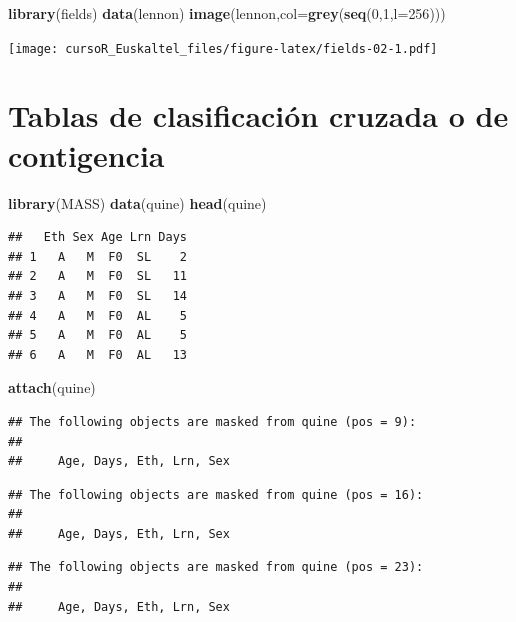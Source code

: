 \documentclass[]{book}
\newenvironment{Shaded}{\begin{snugshade}}{\end{snugshade}}
\newcommand{\KeywordTok}[1]{\textcolor[rgb]{0.13,0.29,0.53}{\textbf{#1}}}
\newcommand{\DataTypeTok}[1]{\textcolor[rgb]{0.13,0.29,0.53}{#1}}
\newcommand{\DecValTok}[1]{\textcolor[rgb]{0.00,0.00,0.81}{#1}}
\newcommand{\NormalTok}[1]{#1}
\begin{document}
\begin{Shaded}
\begin{Highlighting}[]
\KeywordTok{library}\NormalTok{(fields)}
\KeywordTok{data}\NormalTok{(lennon)}
\KeywordTok{image}\NormalTok{(lennon,}\DataTypeTok{col=}\KeywordTok{grey}\NormalTok{(}\KeywordTok{seq}\NormalTok{(}\DecValTok{0}\NormalTok{,}\DecValTok{1}\NormalTok{,}\DataTypeTok{l=}\DecValTok{256}\NormalTok{)))}
\end{Highlighting}
\end{Shaded}

\texttt{[image: cursoR\_Euskaltel\_files/figure-latex/fields-02-1.pdf]}

\section{Tablas de clasificación cruzada o de
contigencia}\label{tablas-de-clasificacion-cruzada-o-de-contigencia}

\begin{Shaded}
\begin{Highlighting}[]
\KeywordTok{library}\NormalTok{(MASS)}
\KeywordTok{data}\NormalTok{(quine)}
\KeywordTok{head}\NormalTok{(quine)}
\end{Highlighting}
\end{Shaded}

\begin{verbatim}
##   Eth Sex Age Lrn Days
## 1   A   M  F0  SL    2
## 2   A   M  F0  SL   11
## 3   A   M  F0  SL   14
## 4   A   M  F0  AL    5
## 5   A   M  F0  AL    5
## 6   A   M  F0  AL   13
\end{verbatim}

\begin{Shaded}
\begin{Highlighting}[]
\KeywordTok{attach}\NormalTok{(quine)}
\end{Highlighting}
\end{Shaded}

\begin{verbatim}
## The following objects are masked from quine (pos = 9):
## 
##     Age, Days, Eth, Lrn, Sex
\end{verbatim}

\begin{verbatim}
## The following objects are masked from quine (pos = 16):
## 
##     Age, Days, Eth, Lrn, Sex
\end{verbatim}

\begin{verbatim}
## The following objects are masked from quine (pos = 23):
## 
##     Age, Days, Eth, Lrn, Sex
\end{verbatim}
\end{document}
